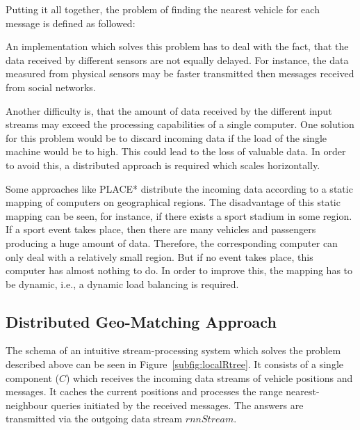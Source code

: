 Putting it all together, the problem of finding the nearest vehicle for each message is defined as followed:

{
}

An implementation which solves this problem has to deal with the fact, that the data received by different sensors are not equally delayed. For instance, the data measured from physical sensors may be faster transmitted then messages received from social networks.

Another difficulty is, that the amount of data received by the different input streams may exceed the processing capabilities of a single computer. One solution for this problem would be to discard incoming data if the load of the single machine would be to high. This could lead to the loss of valuable data. In order to avoid this, a distributed approach is required which scales horizontally.

Some approaches like PLACE* \cite{Xiong2007PAD} distribute the incoming data according to a static mapping of computers on geographical regions. The disadvantage of this static mapping can be seen, for instance, if there exists a sport stadium in some region. If a sport event takes place, then there are many vehicles and passengers producing a huge amount of data. Therefore, the corresponding computer can only deal with a relatively small region. But if no event takes place, this computer has almost nothing to do. In order to improve this, the mapping has to be dynamic, i.e., a dynamic load balancing is required.

\subsection{Distributed Geo-Matching Approach}\label{sec:approach}

The schema of an intuitive stream-processing system which solves the problem described above can be seen in Figure~\ref{subfig:localRtree}. It consists of a single component ($C$) which receives the incoming data streams of vehicle positions and messages. It caches the current positions and processes the range nearest-neighbour queries initiated by the received messages. The answers are transmitted via the outgoing data stream $rnnStream$.

